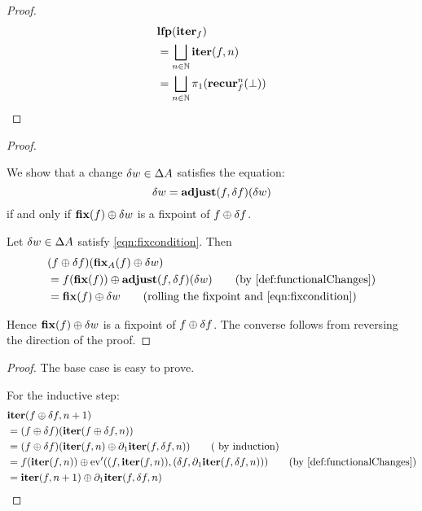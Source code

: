 \fixpointIter*
\begin{proof}
  \label{prf:fixpointIter}
  \begin{align*}
    &\mathbf{lfp}(\mathbf{iter}_f)\\
    &=\bigsqcup_{n \in \mathbb{N}} \mathbf{iter}(f, n)\\
    &=\bigsqcup_{n \in \mathbb{N}} \pi_1 (\mathbf{recur}_f^n(\bot))
  \end{align*}
\end{proof}

\fixpointPseudoDerivatives*
\begin{proof}
  \label{prf:fixpointPseudoDerivatives}
  
  We show that a change $\delta w \in \Delta A$ satisfies
  the equation:
  \begin{equation}\label{eqn:fixcondition}
    \delta w = \mathbf{adjust}(f, \delta f)(\delta w)
  \end{equation}
  if and only if $\mathbf{fix}(f) \oplus \delta w$ is a fixpoint of $f \oplus \delta f$.

  Let $\delta w \in \Delta A$ satisfy \cref{eqn:fixcondition}. Then
  \begin{align*}
    &(f \cplus \change{f})(\fixpoint_A(f) \cplus \change{w})\\
    &= f(\fixpoint(f))
    \cplus
    \adjust(f, \change{f})(\change{w})
    \tag{by \cref{def:functionalChanges}}\\
    &= \fixpoint(f)
    \cplus
    \change{w}
    \tag{rolling the fixpoint and \cref{eqn:fixcondition}}
  \end{align*}

  Hence $\mathbf{fix}(f) \oplus \delta w$ is a fixpoint of $f \oplus \delta f$. The converse
  follows from reversing the direction of the proof.
\end{proof}

\iterDerivativesF*
\begin{proof}
  \label{prf:iterDerivativesF}
  The base case is easy to prove.

  For the inductive step:
  \begin{align*}
    &\iter(f \cplus \change{f}, n + 1)\\
    &=(f \cplus \change{f})(\iter(f \cplus \change{f}, n))\\
    &= (f \cplus \change{f})(
        \iter(f, n)
        \cplus \partial_1{\iter}(f, \change{f}, n)
      )
    \tag{ by induction}\\
    &= f(\iter(f, n)) \cplus \derive{\ev}((f, \iter(f, n)), (\change{f},
      \partial_1{\iter}(f, \change{f}, n)))
    \tag{by \cref{def:functionalChanges}}\\
    & =\iter(f, n + 1) \cplus \partial_1{\iter}(f, \change{f}, n)
  \end{align*}
\end{proof}

